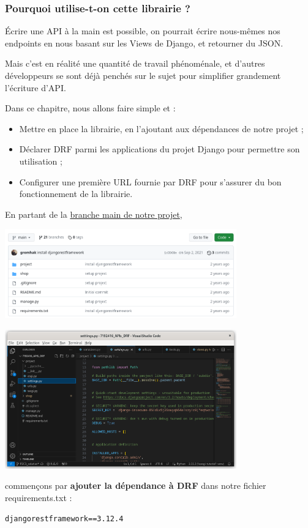 \documentclass[a4paper]{article}
\begin{document}
\subsubsection*{Pourquoi utilise-t-on cette librairie ?}
Écrire une API à la main est possible, on pourrait écrire nous-mêmes nos endpoints en nous basant sur les Views de Django, et retourner du JSON.

Mais c’est en réalité une quantité de travail phénoménale, et d’autres développeurs se sont déjà penchés sur le sujet pour simplifier grandement l’écriture d’API.

Dans ce chapitre, nous allons faire simple et :
\begin{itemize}
\item Mettre en place la librairie, en l’ajoutant aux dépendances de notre projet ;
\item Déclarer DRF parmi les applications du projet Django pour permettre son utilisation ;
\item Configurer une première URL fournie par DRF pour s’assurer du bon fonctionnement de la librairie.
\end{itemize}
En partant de la \href{https://github.com/OpenClassrooms-Student-Center/7192416_APIs_DRF}{branche main de notre projet},
\begin{center}
\includegraphics[width=10cm]{images/image02.png}
\end{center}
\begin{center}
\includegraphics[width=10cm]{images/image03.png}
\end{center}
 commençons par {\bf ajouter la dépendance à DRF} dans notre fichier {\color{monOrange}requirements.txt}  :
\begin{verbatim}
djangorestframework==3.12.4
\end{verbatim}
\end{document}
